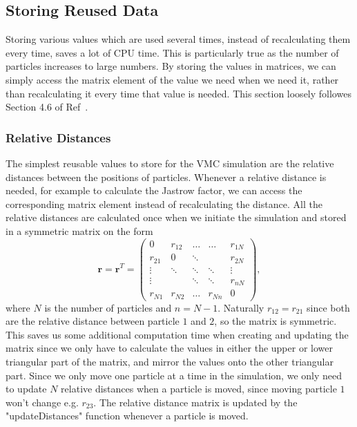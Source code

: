 \documentclass[../main.tex]{subfiles}
\begin{document}
\subsection{Storing Reused Data}

Storing various values which are used several times, instead of recalculating them every time, saves a lot of CPU time. This is particularly true as the number of particles increases to large numbers. By storing the values in matrices, we can simply access the matrix element of the value we need when we need it, rather than recalculating it every time that value is needed. This section loosely followes Section 4.6 of Ref~\cite{}.

\subsubsection{Relative Distances}

The simplest reusable values to store for the VMC simulation are the relative distances between the positions of particles. Whenever a relative distance is needed, for example to calculate the Jastrow factor, we can access the corresponding matrix element instead of recalculating the distance. All the relative distances are calculated once when we initiate the simulation and stored in a symmetric matrix on the form
\begin{equation}
    \mathbf{r} = \mathbf{r}^T =
    \left( \begin{array}{ccccc} 0 & r_{12} & \dots & \dots & r_{1N}\\
                                r_{21} & 0 & \ddots &  & r_{2N}\\
                                \vdots & \ddots & \ddots & \ddots & \vdots\\
                                \vdots &  & \ddots & \ddots & r_{nN}\\
                                r_{N1} & r_{N2} & \dots & r_{Nn} & 0

             \end{array} \right),
\end{equation}
where $N$ is the number of particles and $n=N-1$. Naturally $r_{12} = r_{21}$ since both are the relative distance between particle $1$ and $2$, so the matrix is symmetric. This saves us some additional computation time when creating and updating the matrix since we only have to calculate the values in either the upper or lower triangular part of the matrix, and mirror the values onto the other triangular part. Since we only move one particle at a time in the simulation, we only need to update $N$ relative distances when a particle is moved, since moving particle $1$ won't change e.g. $r_{23}$. The relative distance matrix is updated by the "updateDistances" function whenever a particle is moved.
\end{document}
